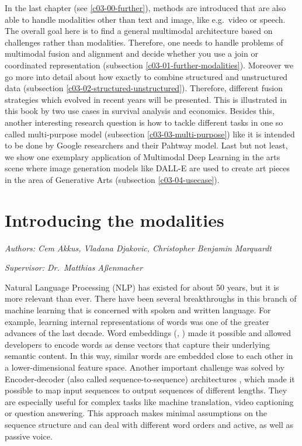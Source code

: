 \documentclass[
]{krantz}
\begin{document}
In the last chapter (see \ref{c03-00-further}), methods are introduced that are also able to handle modalities other than text and image, like e.g.~video or speech. The overall goal here is to find a general multimodal architecture based on challenges rather than modalities. Therefore, one needs to handle problems of multimodal fusion and alignment and decide whether you use a join or coordinated representation (subsection \ref{c03-01-further-modalities}). Moreover we go more into detail about how exactly to combine structured and unstructured data (subsection \ref{c03-02-structured-unstructured}). Therefore, different fusion strategies which evolved in recent years will be presented. This is illustrated in this book by two use cases in survival analysis and economics. Besides this, another interesting research question is how to tackle different tasks in one so called multi-purpose model (subsection \ref{c03-03-multi-purpose}) like it is intended to be done by Google researchers \citet{Pathways} and their Pahtway model. Last but not least, we show one exemplary application of Multimodal Deep Learning in the arts scene where image generation models like DALL-E \citep{DALLE} are used to create art pieces in the area of Generative Arts (subsection \ref{c03-04-usecase}).

\hypertarget{c01-00-intro-modalities}{%
\chapter{Introducing the modalities}\label{c01-00-intro-modalities}}

\emph{Authors: Cem Akkus, Vladana Djakovic, Christopher Benjamin Marquardt}

\emph{Supervisor: Dr.~Matthias Aßenmacher}

Natural Language Processing (NLP) has existed for about 50 years, but it is more relevant than ever. There have been several breakthroughs in this branch of machine learning that is concerned with spoken and written language. For example, learning internal representations of words was one of the greater advances of the last decade. Word embeddings (\citet{Mikolov2013}, \citet{Bojanowski2016}) made it possible and allowed developers to encode words as dense vectors that capture their underlying semantic content. In this way, similar words are embedded close to each other in a lower-dimensional feature space. Another important challenge was solved by Encoder-decoder (also called sequence-to-sequence) architectures \citet{Sutskever2014}, which made it possible to map input sequences to output sequences of different lengths. They are especially useful for complex tasks like machine translation, video captioning or question answering. This approach makes minimal assumptions on the sequence structure and can deal with different word orders and active, as well as passive voice.
\end{document}
